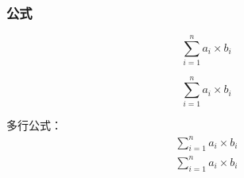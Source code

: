 \subsubsection{公式}
	\begin{equation}\label{eq:test2}
	\sum_{i=1}^n a_i \times b_i 
	\end{equation}
	
	\begin{equation}
		\sum_{i=1}^n a_i \times b_i 
		\end{equation}
		
	多行公式：
	\begin{eqnarray}
			\sum_{i=1}^n a_i \times b_i  \nonumber \\
				\sum_{i=1}^n a_i \times b_i 
	\end{eqnarray}
